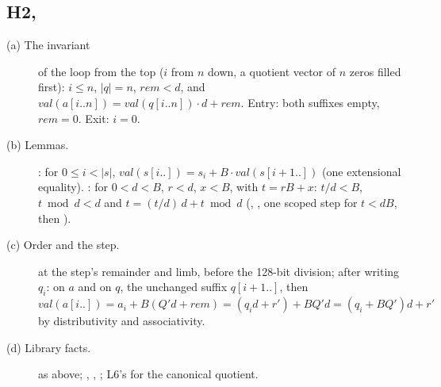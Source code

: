 \documentclass[11pt]{article}
\begin{document}
\subsection*{H2, }
\begin{description}
\item[(a) The invariant] of the loop from the top ($i$ from $n$ down, a
  quotient vector of $n$ zeros filled first): $i \le n$, $|q| = n$,
  $\mathit{rem} < d$, and
  $\mathit{val}(a[i..n]) = \mathit{val}(q[i..n])\cdot d + \mathit{rem}$.
  Entry: both suffixes empty, $\mathit{rem} = 0$. Exit: $i = 0$.
\item[(b) Lemmas.] : for $0 \le i < |s|$,
  $\mathit{val}(s[i..]) = s_i + B\cdot\mathit{val}(s[i+1..])$ (one
  extensional equality). : for $0 < d < B$, $r
  < d$, $x < B$, with $t = rB + x$: $t/d < B$, $t \bmod d < d$ and $t =
  (t/d)\,d + t \bmod d$ (,
  , one scoped  step for $t <
  dB$, then ).
\item[(c) Order and the step.]  at the step's
  remainder and limb, before the 128-bit division; after writing $q_i$:
   on $a$ and on $q$, the unchanged suffix
  $q[i+1..]$, then $\mathit{val}(a[i..]) = a_i + B(Q'd + \mathit{rem}) =
  (q_i d + r') + B Q' d = (q_i + B Q') d + r'$ by distributivity and
  associativity.
\item[(d) Library facts.]  as above;
  ,
  , ; L6's
   for the canonical quotient.
\end{description}
\end{document}
